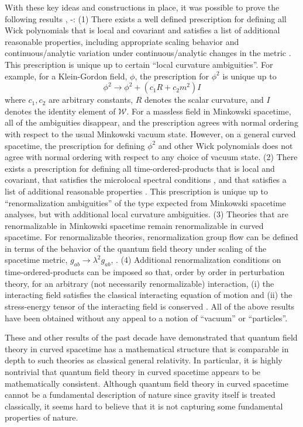 \documentclass[12pt,epsf,amsfonts,amssymb]{article}
\begin{document}
With these key ideas and constructions in place, it was possible to
prove the following results \cite{hw1}, \cite{hw2}-\cite{hw4}: (1)
There exists a well defined prescription for defining all Wick
polynomials that is local and covariant and satisfies a list of
additional reasonable properties, including appropriate scaling
behavior and continuous/analytic variation under continuous/analytic
changes in the metric \cite{hw1}. This prescription is unique up to certain
``local curvature ambiguities''. For example, for a Klein-Gordon
field, $\phi$, the prescription for $\phi^2$ is unique up to
\begin{equation}
\phi^2 \rightarrow \phi^2 + (c_1 R + c_2 m^2) I 
\end{equation}
where $c_1, c_2$ are arbitrary constants, $R$ denotes the scalar
curvature, and $I$ denotes the identity element of $\mathcal W$. For a
massless field in Minkowski spacetime, all of the ambiguities
disappear, and the prescription agrees with normal ordering with
respect to the usual Minkowski vacuum state. However, on a general
curved spacetime, the prescription for defining $\phi^2$ and other
Wick polynomials does not agree with normal ordering with respect to
any choice of vacuum state. (2) There exists a prescription for
defining all time-ordered-products that is local and covariant, that
satisfies the microlocal spectral conditions \cite{bf}, and that
satisfies a list of additional reasonable properties \cite{hw2}. This
prescription is unique up to ``renormalization ambiguities'' of the
type expected from Minkowski spacetime analyses, but with additional
local curvature ambiguities. (3) Theories that are renormalizable in
Minkowski spacetime remain renormalizable in curved spacetime. For
renormalizable theories, renormalization group flow can be defined in
terms of the behavior of the quantum field theory under scaling of the
spacetime metric, $g_{ab} \rightarrow \lambda^2 g_{ab}$, \cite{hw3}.
(4) Additional renormalization conditions on time-ordered-products can
be imposed so that, order by order in perturbation theory, for an
arbitrary (not necessarily renormalizable) interaction, (i) the
interacting field satisfies the classical interacting equation of
motion and (ii) the stress-energy tensor of the interacting field is
conserved \cite{hw4}. All of the above results have been obtained
without any appeal to a notion of ``vacuum'' or ``particles''.

These and other results of the past decade have demonstrated that
quantum field theory in curved spacetime has a mathematical structure
that is comparable in depth to such theories as classical general
relativity. In particular, it is highly nontrivial that quantum field
theory in curved spacetime appears to be mathematically
consistent. Although quantum field theory in curved spacetime cannot
be a fundamental description of nature since gravity itself is treated
classically, it seems hard to believe that it is not capturing some
fundamental properties of nature.
\end{document}
